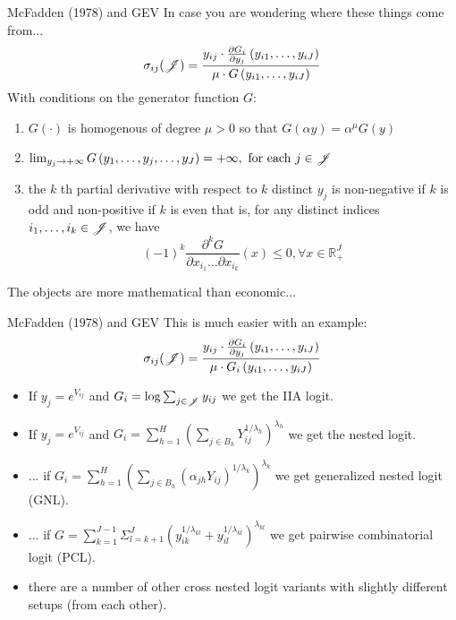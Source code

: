 \documentclass[aspectratio=169,11pt]{beamer}
\begin{document}
\begin{frame}{McFadden (1978) and GEV}
In case you are wondering where these things come from...
\begin{align*}
\sigma_{ij}(\mathscr{J})=\frac{y_{ij}\cdot  \frac{\partial G_i}{\partial y_{j}}\left(y_{i1}, \ldots, y_{iJ}\right)}{\mu \cdot G\left(y_{i1}, \ldots, y_{iJ}\right)}
\end{align*}
With conditions on the \alert{generator function} $G$:
\begin{enumerate}
\item $G(\cdot)$ is homogenous of degree $\mu > 0$ so that $G(\alpha y)=\alpha^{\mu} G(y)$
\item $\lim _{y_{j} \rightarrow+\infty} G\left(y_{1}, \ldots, y_{j}, \ldots, y_{J}\right)=+\infty, \text { for each } j \in \mathscr{J} $
\item the $k$ th partial derivative with respect to $k$ distinct $y_{j}$ is \alert{non-negative if $k$ is
odd} and \alert{non-positive if $k$ is even} that is, for any distinct indices $i_{1}, \ldots, i_{k} \in \mathscr{J}$, we have
$$
(-1)^{k} \frac{\partial^{k} G}{\partial x_{i_{1}} \ldots \partial x_{i_{k}}}(x) \leq 0, \forall x \in \mathbb{R}_{+}^{J}
$$
\end{enumerate}
The objects are more mathematical than economic...
\end{frame}



\begin{frame}{McFadden (1978) and GEV}
This is much easier with an example:
\begin{align*}
\sigma_{ij}(\mathscr{J})=\frac{y_{ij}\cdot  \frac{\partial G_i}{\partial y_{j}}\left(y_{i1}, \ldots, y_{iJ}\right)}{\mu \cdot G_i\left(y_{i1}, \ldots, y_{iJ}\right)}
\end{align*}
\begin{itemize}
\item If $y_j = e^{V_{ij}}$ and $G_i = \log \sum_{j \in \mathscr{J}} y_{ij} $ we get the IIA logit.
\item If $y_j = e^{V_{ij}}$ and $G_i=\sum_{h=1}^{H}\left(\sum_{j \in B_{h}} Y_{ij}^{1 / \lambda_{h}}\right)^{\lambda_{h}}$ we get the nested logit.
\item ... if $G_i=\sum_{h=1}^{H}\left(\sum_{j \in B_{h}}\left(\alpha_{j h} Y_{ij}\right)^{1 / \lambda_{k}}\right)^{\lambda_{k}}$ we get \alert{generalized nested logit} (GNL).
\item ... if $G=\sum_{k=1}^{J-1} \Sigma_{l=k+1}^{J}\left(y_{i k}^{1 / \lambda_{k l}}+y_{i l}^{1 / \lambda_{k l}}\right)^{\lambda_{k l}}$ we get \alert{pairwise combinatorial logit} (PCL).
\item there are a number of other \alert{cross nested logit} variants with slightly different setups (from each other).
\end{itemize}
\end{frame}
\end{document}
